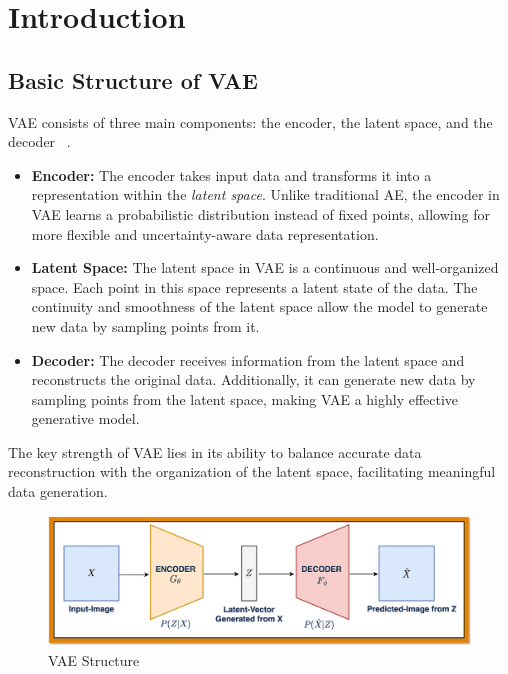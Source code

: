 \section{Introduction}
\label{sec:intro}

\subsection{Basic Structure of VAE}

VAE consists of three main components: the encoder, the latent space, and the decoder ~\cite{chan2025tutorial}.

\begin{itemize}
    \item \textbf{Encoder:}
    The encoder takes input data and transforms it into a representation within the \textit{latent space}. Unlike traditional AE, the encoder in VAE learns a probabilistic distribution instead of fixed points, allowing for more flexible and uncertainty-aware data representation.

    \item \textbf{Latent Space:}  
    The latent space in VAE is a continuous and well-organized space. Each point in this space represents a latent state of the data. The continuity and smoothness of the latent space allow the model to generate new data by sampling points from it.

    \item \textbf{Decoder:}  
    The decoder receives information from the latent space and reconstructs the original data. Additionally, it can generate new data by sampling points from the latent space, making VAE a highly effective generative model.
\end{itemize}

The key strength of VAE lies in its ability to balance accurate data reconstruction with the organization of the latent space, facilitating meaningful data generation.

\begin{figure}[H]
    \centering
    \includegraphics[width=1.0\linewidth]{sec/VAE.png}
    \caption{VAE Structure}
\end{figure}

